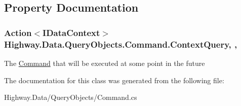 \subsection{Property Documentation}
\hypertarget{class_highway_1_1_data_1_1_query_objects_1_1_command_a83c9845e7df1f9ff350d05182c23e373}{
\subsubsection[{Context\-Query}]{\setlength{\rightskip}{0pt plus 5cm}Action$<${\bf I\-Data\-Context}$>$ Highway.\-Data.\-Query\-Objects.\-Command.\-Context\-Query\hspace{0.3cm}{\ttfamily [get]}, {\ttfamily [set]}, {\ttfamily [protected]}}}\label{class_highway_1_1_data_1_1_query_objects_1_1_command_a83c9845e7df1f9ff350d05182c23e373}


The \hyperlink{class_highway_1_1_data_1_1_query_objects_1_1_command}{Command} that will be executed at some point in the future 



The documentation for this class was generated from the following file\-:\begin{DoxyCompactItemize}
\item 
Highway.\-Data/\-Query\-Objects/Command.\-cs\end{DoxyCompactItemize}
